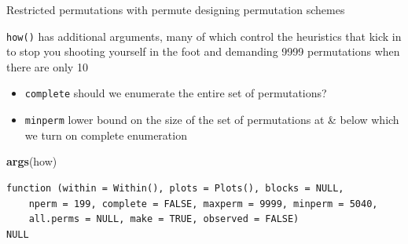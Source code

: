 \documentclass[10pt,ignorenonframetext,compress, aspectratio=169]{beamer}
\newenvironment{Shaded}{\begin{snugshade}}{\end{snugshade}}
\newcommand{\KeywordTok}[1]{\textcolor[rgb]{0.13,0.29,0.53}{\textbf{{#1}}}}
\newcommand{\NormalTok}[1]{{#1}}
\providecommand{\tightlist}{%
  \setlength{\itemsep}{0pt}\setlength{\parskip}{0pt}}
\begin{document}
\begin{frame}[fragile]{Restricted permutations with permute \textbar{}
designing permutation schemes}

\texttt{how()} has additional arguments, many of which control the
heuristics that kick in to stop you shooting yourself in the foot and
demanding 9999 permutations when there are only 10

\begin{itemize}
\tightlist
\item
  \texttt{complete} should we enumerate the entire set of permutations?
\item
  \texttt{minperm} lower bound on the size of the set of permutations at
  \& below which we turn on complete enumeration
\end{itemize}

\scriptsize

\begin{Shaded}
\begin{Highlighting}[]
\KeywordTok{args}\NormalTok{(how)}
\end{Highlighting}
\end{Shaded}

\begin{verbatim}
function (within = Within(), plots = Plots(), blocks = NULL, 
    nperm = 199, complete = FALSE, maxperm = 9999, minperm = 5040, 
    all.perms = NULL, make = TRUE, observed = FALSE) 
NULL
\end{verbatim}

\normalsize

\end{frame}
\end{document}
